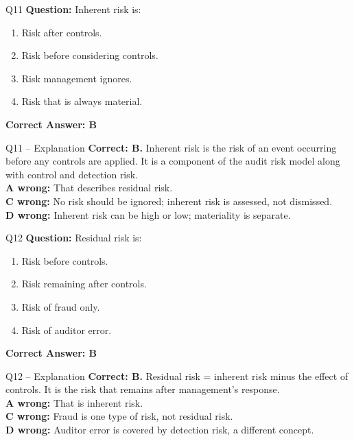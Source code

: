 \documentclass[aspectratio=169,10pt]{beamer}
\begin{document}
	\begin{frame}[t]{Q11}
		\small
		\textbf{Question:} Inherent risk is:
		\begin{enumerate}[label=\Alph*.,itemsep=1pt,topsep=2pt]
			\item Risk after controls.
			\item Risk before considering controls.
			\item Risk management ignores.
			\item Risk that is always material.
		\end{enumerate}
		\vspace{4pt}
		\textbf{Correct Answer: B}
	\end{frame}
	
	\begin{frame}[t]{Q11 -- Explanation}
		\small
		\textbf{Correct: B.} Inherent risk is the risk of an event occurring before any controls are applied. It is a component of the audit risk model along with control and detection risk. \\[4pt]
		\textbf{A wrong:} That describes residual risk. \\[2pt]
		\textbf{C wrong:} No risk should be ignored; inherent risk is assessed, not dismissed. \\[2pt]
		\textbf{D wrong:} Inherent risk can be high or low; materiality is separate.
	\end{frame}
	
	\begin{frame}[t]{Q12}
		\small
		\textbf{Question:} Residual risk is:
		\begin{enumerate}[label=\Alph*.,itemsep=1pt,topsep=2pt]
			\item Risk before controls.
			\item Risk remaining after controls.
			\item Risk of fraud only.
			\item Risk of auditor error.
		\end{enumerate}
		\vspace{4pt}
		\textbf{Correct Answer: B}
	\end{frame}
	
	\begin{frame}[t]{Q12 -- Explanation}
		\small
		\textbf{Correct: B.} Residual risk = inherent risk minus the effect of controls. It is the risk that remains after management's response. \\[4pt]
		\textbf{A wrong:} That is inherent risk. \\[2pt]
		\textbf{C wrong:} Fraud is one type of risk, not residual risk. \\[2pt]
		\textbf{D wrong:} Auditor error is covered by detection risk, a different concept.
	\end{frame}
	
\end{document}

